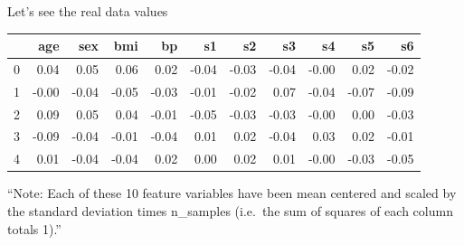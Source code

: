 \documentclass[obeyspaces,aspectratio=43]{beamer}
\begin{document}
\begin{frame}{Let's see the real data values}

\tiny
\center

\begin{tabular}{lrrrrrrrrrr}
\toprule                                                                                                                                                                      
{} &   age &   sex &   bmi &    bp &    s1 &    s2 &    s3 &    s4 &    s5 &    s6 \\                                                                                         
\midrule                                                                                                                                                                      
0 &  0.04 &  0.05 &  0.06 &  0.02 & -0.04 & -0.03 & -0.04 & -0.00 &  0.02 & -0.02 \\                                                                                          
1 & -0.00 & -0.04 & -0.05 & -0.03 & -0.01 & -0.02 &  0.07 & -0.04 & -0.07 & -0.09 \\                                                                                          
2 &  0.09 &  0.05 &  0.04 & -0.01 & -0.05 & -0.03 & -0.03 & -0.00 &  0.00 & -0.03 \\                                                                                          
3 & -0.09 & -0.04 & -0.01 & -0.04 &  0.01 &  0.02 & -0.04 &  0.03 &  0.02 & -0.01 \\                                                                                          
4 &  0.01 & -0.04 & -0.04 &  0.02 &  0.00 &  0.02 &  0.01 & -0.00 & -0.03 & -0.05 \\                                                                                          
\bottomrule                                                                                                                                                                   
\end{tabular}

``Note: Each of these 10 feature variables have been mean centered and
scaled by the standard deviation times n\_samples (i.e.~the sum of
squares of each column totals 1).''


\end{frame}
\end{document}

